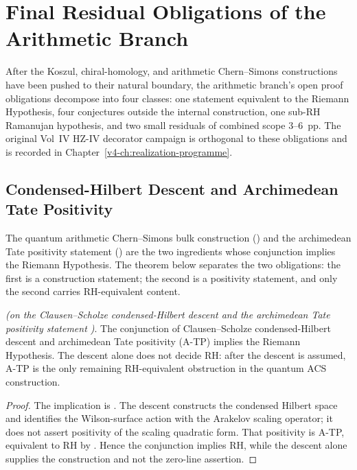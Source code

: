 \chapter{Final Residual Obligations of the Arithmetic Branch}
\label{v4-arith:w10-final:chapter}

After the Koszul, chiral-homology, and arithmetic Chern--Simons
constructions have been pushed to their natural boundary, the
arithmetic branch's open proof obligations decompose into four classes:
one statement equivalent to the Riemann Hypothesis, four conjectures
outside the internal construction, one sub-RH Ramanujan hypothesis,
and two small residuals of combined scope \(3\)--\(6\)~pp. The
original Vol~IV HZ-IV decorator campaign is orthogonal to these
obligations and is recorded in Chapter~\ref{v4-ch:realization-programme}.

\section{Condensed-Hilbert Descent and Archimedean Tate Positivity}
\label{v4-arith:w10-final:w10-a}

The quantum arithmetic Chern--Simons bulk construction
() and the archimedean
Tate positivity statement ()
are the two ingredients whose conjunction implies the Riemann
Hypothesis. The theorem below separates the two obligations:
the first is a construction statement; the second is a positivity
statement, and only the second carries RH-equivalent content.

\begin{theorem}
\label{v4-arith:w10-final:thm:cs-descent-atp-rh}
\ClaimStatusProvedHereConditional \emph{(on the Clausen--Scholze
condensed-Hilbert descent 
and the archimedean Tate positivity statement
)}. The
conjunction of Clausen--Scholze condensed-Hilbert descent and
archimedean Tate positivity (A-TP) implies the Riemann Hypothesis.
The descent alone does not decide RH: after the descent is assumed,
A-TP is the only remaining RH-equivalent obstruction in the quantum
ACS construction.
\end{theorem}

\begin{proof}
The implication is
. The descent
constructs the condensed Hilbert space and identifies the
Wilson-surface action with the Arakelov scaling operator; it does
not assert positivity of the scaling quadratic form. That positivity
is A-TP, equivalent to RH by
. Hence the conjunction implies
RH, while the descent alone supplies the construction and not the
zero-line assertion.
\end{proof}

